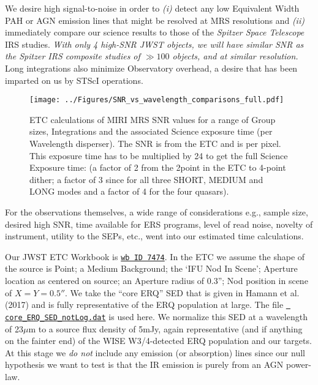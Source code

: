 \smallskip \smallskip
\noindent 
We desire high signal-to-noise in order to {\it(i)} detect any low
Equivalent Width PAH or AGN emission lines that might be resolved at
MRS resolutions and {\it(ii)} immediately compare our science results
to those of the {\it Spitzer Space Telescope} IRS studies.  {\it
With only 4 high-SNR JWST objects, we will have similar SNR as the
Spitzer IRS composite studies of $\gg100$ objects, and at similar
resolution.}  Long integrations also minimize Observatory overhead, a
desire that has been imparted on us by STScI operations.

\begin{figure}[h]
  \begin{center}
    \texttt{[image: ../Figures/SNR\_vs\_wavelength\_comparisons\_full.pdf]}
    \end{center}
    \vspace{-20pt}
    \caption{ETC calculations of MIRI MRS SNR values for a range of Group
      sizes, Integrations and the associated Science exposure time (per
      Wavelength disperser). The SNR is from the ETC and is per pixel. 
      This exposure time 
      has to be multiplied by 24 to get the full Science Exposure time:   
      (a factor of 2 from the 2point in the ETC to 4-point dither; 
      a factor of 3 since for all three SHORT, MEDIUM and LONG modes and 
      a factor of 4 for the four quasars). 
 }
    \label{fig:SNR_vs_wavelength}
  \end{figure}

\smallskip \smallskip
\noindent 
For the observations themselves, a wide range of considerations e.g.,
sample size, desired high SNR, time available for ERS programs, level
of read noise, novelty of instrument, utility to the SEPs, etc., went
into our estimated time calculations.

\smallskip \smallskip 
\noindent
Our JWST ETC Workbook is
\href{https://jwst.etc.stsci.edu/workbook.html?wb_id=7474}{{\tt wb ID
7474}}.  In the ETC we assume the shape of the source is Point; a
Medium Background; the `IFU Nod In Scene'; Aperture location as
centered on source; an Aperture radius of 0.3''; Nod position in scene
of $X=Y=0.5''$.  We take the ``core ERQ'' SED that is given in Hamann
et al. (2017) and is fully representative of the ERQ population at
large.  The file
\href{https://github.com/d80b2t/JWST_ERS/blob/master/ETC_calcs/core_ERQ_SED_notLog.dat}{\tt
core\_ERQ\_SED\_notLog.dat} is used here.  We normalize this SED at a
wavelength of 23$\mu$m to a source flux density of 5mJy, again
representative (and if anything on the fainter end) of the WISE
W3/4-detected ERQ population and our targets.  At this stage we {\it
do not} include any emission (or absorption) lines since our null
hypothesis we want to test is that the IR emission is purely from an
AGN power-law.

